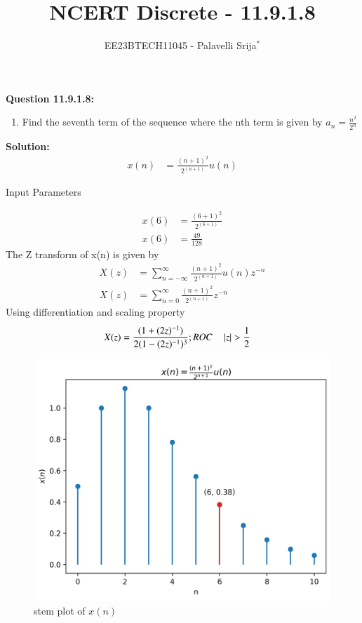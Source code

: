 \documentclass[journal,12pt,twocolumn]{IEEEtran}
\theoremstyle{remark}
\begin{document}

\vspace{3cm}

\title{NCERT Discrete - 11.9.1.8}
\author{EE23BTECH11045 - Palavelli Srija$^{*}$%
}
\maketitle
\newpage
\bigskip

\renewcommand{\thefigure}{\theenumi}
\renewcommand{\thetable}{\theenumi}

\vspace{3cm}
\textbf{Question 11.9.1.8:} 
\begin{enumerate}
\item Find the seventh term of the sequence where the nth term is given by $a_n= \frac {n^2}{2^{n}}$

\end{enumerate}
\textbf{Solution: }
\begin{align}
 x(n) &= \frac{(n+1)^2}{2^{(n+1)}}u(n)
\end{align}
\begin{table}[h!]
    \centering
    
    \caption{Input Parameters}
    \label{tab:table_9.8.1}
   \end{table}
\begin{align}
x(6) &= \frac{(6+1)^2}{2^{(6+1)}}\\
x(6) &= \frac {49}{128}
\end{align}
The Z transform of x(n) is given by
\begin{align}
X(z) &= \sum_{n=-\infty}^{\infty} \frac{(n+1)^2}{2^{(n+1)}}u(n) z^{-n}\\
X(z) &= \sum_{n=0}^{\infty} \frac {(n+1)^2}{2^{(n+1)}}z^{-n}
\end{align}
Using differentiation and scaling property
\begin{align}
X(z) &=  \frac {(1+(2z)^{-1})}{2(1-(2z)^{-1})^{3}}; ROC \quad \left\vert z\right\vert > \frac{1}{2}
\end{align}
\begin{figure}[h!]
    \centering
    \includegraphics[width=\columnwidth]{figs/plot.png}
    \caption{stem plot of $x(n)$}
    \label{fig:1}
\end{figure}
\end{document}
